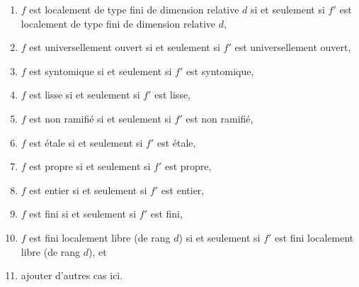 \begin{lemma}
\begin{enumerate}
$f$ est localement de présentation finie si et seulement si $f'$ est localement de
présentation finie,
\item
\label{item-relative-dimension-d}
$f$ est localement de type fini de dimension relative $d$ si et seulement si
$f'$ est localement de type fini de dimension relative $d$,
\item $f$ est universellement ouvert si et seulement si $f'$ est universellement ouvert,
\label{item-universally-open}
\item $f$ est syntomique si et seulement si $f'$ est syntomique,
\label{item-syntomic}
\item $f$ est lisse si et seulement si $f'$ est lisse,
\label{item-smooth}
\item $f$ est non ramifié si et seulement si $f'$ est non ramifié,
\label{item-unramified}
\item $f$ est étale si et seulement si $f'$ est étale,
\label{item-etale}
\item $f$ est propre si et seulement si $f'$ est propre,
\label{item-proper}
\item $f$ est entier si et seulement si $f'$ est entier,
\label{item-integral}
\item $f$ est fini si et seulement si $f'$ est fini,
\label{item-finite}
\item
\label{item-finite-locally-free}
$f$ est fini localement libre (de rang $d$) si et seulement si $f'$
est fini localement libre (de rang $d$), et
\item ajouter d'autres cas ici.
\end{enumerate}
\end{lemma}

